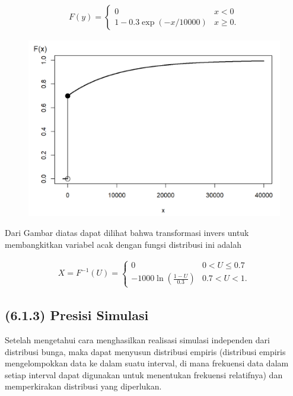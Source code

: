 \documentclass[
]{book}
\begin{document}
\[\begin{aligned}
F(y) = \left\{ \begin{array}{cc}
              0 &  x<0  \\
              1 - 0.3 \exp(-x/10000) & x \ge 0 .
            \end{array} \right.
\end{aligned}\]

\begin{figure}

{\centering \includegraphics[width=1\linewidth]{images/6.1.2-6} 

}

\end{figure}

Dari Gambar diatas dapat dilihat bahwa transformasi invers untuk membangkitkan variabel acak dengan fungsi distribusi ini adalah

\[\begin{aligned}
X = F^{-1}(U) = \left\{ \begin{array}{cc}
              0 &  0< U  \leq  0.7  \\
              -1000 \ln (\frac{1-U}{0.3}) & 0.7 < U < 1 .
            \end{array} \right.
\end{aligned}\]

\hypertarget{presisi-simulasi}{%
\subsection{(6.1.3) Presisi Simulasi}\label{presisi-simulasi}}

Setelah mengetahui cara menghasilkan realisasi simulasi independen dari distribusi bunga, maka dapat menyusun distribusi empiris (distribusi empiris mengelompokkan data ke dalam suatu interval, di mana frekuensi data dalam setiap interval dapat digunakan untuk menentukan frekuensi relatifnya) dan memperkirakan distribusi yang diperlukan.
\end{document}
